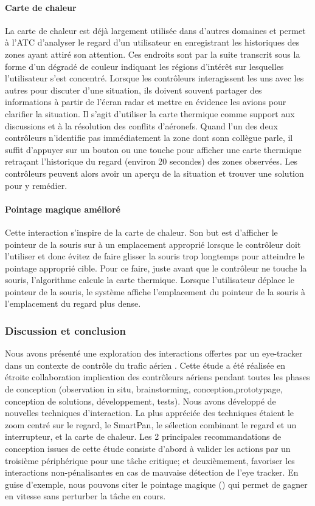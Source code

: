\paragraph{Carte de chaleur}
La carte de chaleur est déjà largement utilisée dans d’autres domaines et
permet à l’ATC d’analyser le regard d’un utilisateur en enregistrant les
historiques des zones ayant attiré son attention. Ces endroits sont
par la suite transcrit sous la forme d'un dégradé de couleur indiquant les
régions d'intérêt sur lesquelles l'utilisateur s'est concentré. Lorsque les contrôleurs interagissent les uns avec les autres pour discuter d'une situation,
ils doivent souvent partager des informations à partir de l'écran radar
et mettre en évidence les avions pour clarifier la situation. 
Il s’agit d’utiliser la carte thermique comme support aux discussions et à la résolution des conflits d’aéronefs. Quand l'un des
deux contrôleurs n'identifie pas immédiatement la zone dont sonn collègue parle, il suffit d'appuyer sur un bouton ou une touche pour afficher une carte thermique retraçant l'historique du regard (environ 20 secondes) des zones observées.
Les contrôleurs peuvent alors avoir un aperçu de la situation et trouver une solution pour y remédier.

\paragraph{Pointage magique amélioré}
Cette interaction s'inspire de la carte de chaleur. Son but est d’afficher le pointeur de la souris sur à un emplacement approprié lorsque le contrôleur doit l'utiliser et donc
évitez de faire glisser la souris trop longtemps pour atteindre le pointage approprié
cible. Pour ce faire, juste avant que le contrôleur ne touche la souris, l'algorithme calcule la carte thermique. Lorsque l'utilisateur déplace le pointeur de la souris, le système affiche l'emplacement du pointeur de la souris à l'emplacement du regard plus dense.

\subsubsection{Discussion et conclusion}
Nous avons présenté une exploration des interactions
offertes par un eye-tracker dans un contexte de contrôle du trafic aérien
. Cette étude a été réalisée en étroite collaboration
implication des contrôleurs aériens pendant toutes les phases de conception
(observation in situ, brainstorming, conception,prototypage, conception de solutions, développement, tests). Nous avons développé de nouvelles techniques d'interaction. La plus appréciée
des techniques étaient le zoom centré sur le regard, le SmartPan, le
sélection combinant le regard et un interrupteur, et la carte de chaleur. Les 2 principales recommandations de conception issues de cette étude consiste d'abord à valider les actions par un troisième périphérique
pour une  tâche critique; et deuxièmement, favoriser les interactions non-pénalisantes
en cas de mauvaise détection de l'eye tracker. En guise d'exemple, nous pouvons citer le pointage magique (\cite{Zhai:1999:MGI:302979.303053}) qui permet de gagner en vitesse sans perturber la tâche en cours.


